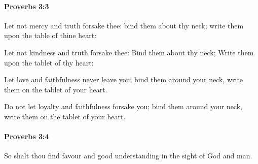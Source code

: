 		\paragraph{Proverbs 3:3} %
			\label{PROVERBS-3-3}

			Let not mercy and truth forsake thee: bind them about thy neck; write them upon the table of thine heart:

			\begin{versebox}
					\item[BHS] 
					\item[ASV] Let not kindness and truth forsake thee: Bind them about thy neck; Write them upon the tablet of thy heart:
					\item[NIV] Let love and faithfulness never leave you; bind them around your neck, write them on the tablet of your heart.
					\item[NRSV] Do not let loyalty and faithfulness forsake you; bind them around your neck, write them on the tablet of your heart.
			\end{versebox}

		\paragraph{Proverbs 3:4} %
			\label{PROVERBS-3-4}

			So shalt thou find favour and good understanding in the sight of God and man.

